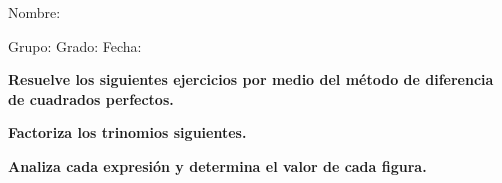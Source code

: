 \documentclass[12pt,addpoints]{exam}
\begin{document}
%

Nombre:\enspace\hrulefill

\vspace{5mm}

Grupo:\enspace\hrulefill
\enspace{}Grado:\enspace\hrulefill
\enspace{}Fecha:\enspace\hrulefill

\begin{questions}

\begin{EnvFullwidth}
  \sffamily\textbf{Resuelve los siguientes ejercicios por medio del método
      de diferencia de cuadrados perfectos.}
\end{EnvFullwidth}


\vspace{\baselineskip}

\vspace{\baselineskip}

\vspace{\baselineskip}

\vspace{\baselineskip}


\begin{EnvFullwidth}
  \sffamily\textbf{ Factoriza los trinomios siguientes.}
\end{EnvFullwidth}


\vspace{\baselineskip}

\vspace{\baselineskip}

\vspace{\baselineskip}

\vspace{\baselineskip}

\vspace{\baselineskip}

\vspace{\baselineskip}

\vspace{\baselineskip}

\vspace{\baselineskip}

\vspace{\baselineskip}

\vspace{\baselineskip}

\begin{EnvFullwidth}
  \sffamily\textbf{Analiza cada expresión y determina el valor de cada
  figura.}
\end{EnvFullwidth}


\vspace{\baselineskip}


\vspace{\baselineskip}

\end{questions}
\end{document}
